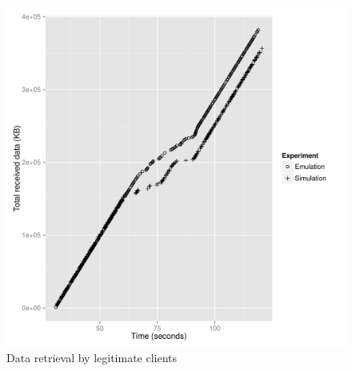 \begin{figure}[htpb]
  \centering
  \includegraphics[scale=0.5]{figures/sim-emu-performance.pdf}
  \caption{Data retrieval by legitimate clients}
  \label{fig:simemuperf}
\end{figure}

